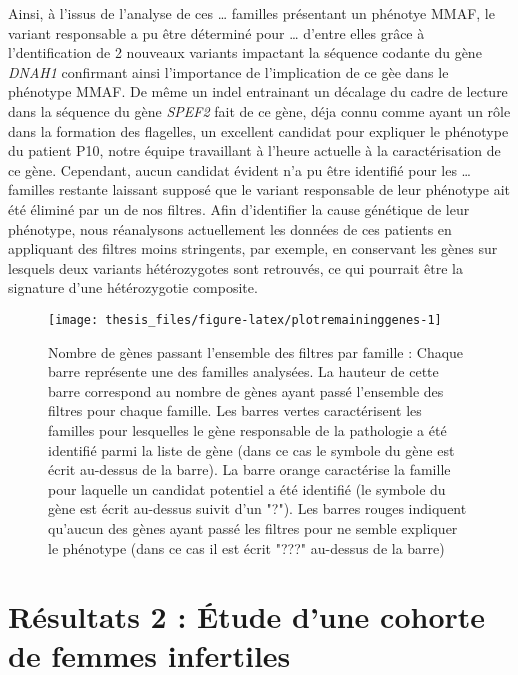 \documentclass[12pt,twoside]{reedthesis}
\theoremstyle{definition}
\theoremstyle{definition}
\theoremstyle{remark}
\begin{document}
  Ainsi, à l'issus de l'analyse de ces \ldots{} familles présentant un
  phénotye MMAF, le variant responsable a pu être déterminé pour \ldots{}
  d'entre elles grâce à l'dentification de 2 nouveaux variants impactant
  la séquence codante du gène \emph{DNAH1} confirmant ainsi l'importance
  de l'implication de ce gèe dans le phénotype MMAF. De même un indel
  entrainant un décalage du cadre de lecture dans la séquence du gène
  \emph{SPEF2} fait de ce gène, déja connu comme ayant un rôle dans la
  formation des flagelles, un excellent candidat pour expliquer le
  phénotype du patient P10, notre équipe travaillant à l'heure actuelle à
  la caractérisation de ce gène. Cependant, aucun candidat évident n'a pu
  être identifié pour les \ldots{} familles restante laissant supposé que
  le variant responsable de leur phénotype ait été éliminé par un de nos
  filtres. Afin d'identifier la cause génétique de leur phénotype, nous
  réanalysons actuellement les données de ces patients en appliquant des
  filtres moins stringents, par exemple, en conservant les gènes sur
  lesquels deux variants hétérozygotes sont retrouvés, ce qui pourrait
  être la signature d'une hétérozygotie composite.
  
  \newpage
  
  \begin{figure}
  
  {\centering \texttt{[image: thesis\_files/figure-latex/plotremaininggenes-1]} 
  
  }
  
  \caption[Nombre de gènes passant l'ensemble des filtres par famille]{Nombre de gènes passant l'ensemble des filtres par famille  :  Chaque barre représente une des familles analysées. La hauteur de cette barre correspond au nombre de gènes ayant passé l'ensemble des filtres pour chaque famille. Les barres vertes caractérisent les familles pour lesquelles le gène responsable de la pathologie a été identifié parmi la liste de gène (dans ce cas le symbole du gène est écrit au-dessus de la barre). La barre orange caractérise la famille pour laquelle un candidat potentiel a été identifié (le symbole du gène est écrit au-dessus suivit d'un "?"). Les barres rouges indiquent qu'aucun des gènes ayant passé les filtres pour ne semble expliquer le phénotype (dans ce cas il est écrit "???" au-dessus de la barre)}\label{fig:plotremaininggenes}
  \end{figure}
  
  \newpage
  
  \section{Résultats 2 : Étude d'une cohorte de femmes
  infertiles}\label{resultats-2-etude-dune-cohorte-de-femmes-infertiles}
  
\end{document}
